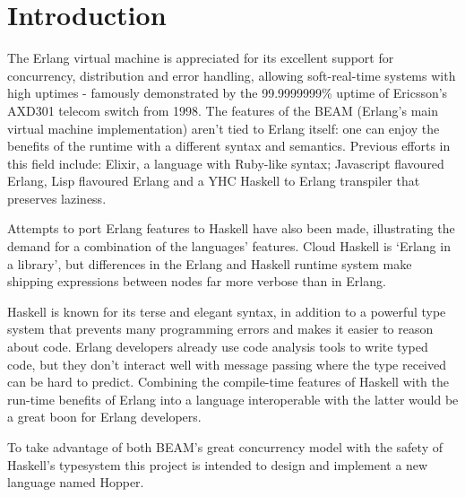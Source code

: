 \chapter{Introduction}


The Erlang virtual machine is appreciated for its excellent support for
concurrency, distribution and error handling, allowing soft-real-time systems
with high uptimes - famously demonstrated by the 99.9999999\% uptime of
Ericsson’s AXD301 telecom switch from 1998. The features of the BEAM (Erlang’s
main virtual machine implementation) aren't tied to Erlang itself: one can
enjoy the benefits of the runtime with a different syntax and semantics.
Previous efforts in this field include: Elixir, a language with Ruby-like
syntax; Javascript flavoured Erlang, Lisp flavoured Erlang and a YHC Haskell
to Erlang transpiler that preserves laziness.

Attempts to port Erlang features to Haskell have also been made, illustrating
the demand for a combination of the languages’ features. Cloud Haskell is
‘Erlang in a library’, but differences in the Erlang and Haskell runtime
system make shipping expressions between nodes far more verbose than in Erlang.

Haskell is known for its terse and elegant syntax, in addition to a powerful
type system that prevents many programming errors and makes it easier to
reason about code. Erlang developers already use code analysis tools to write
typed code, but they don’t interact well with message passing where the type
received can be hard to predict. Combining the compile-time features of Haskell
with the run-time benefits of Erlang into a language interoperable with the
latter would be a great boon for Erlang developers.

To take advantage of both BEAM's great concurrency model with the safety of 
Haskell's typesystem this project is intended to design and implement a new 
language named Hopper.  

